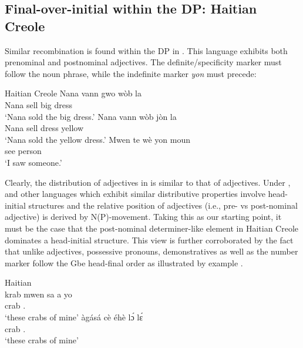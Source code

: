 \documentclass[output=paper]{langsci/langscibook}
\begin{document}
\subsection{Final-over-initial within the DP: Haitian Creole}

Similar recombination is found within the DP in 
\parencite{AbohDeGraff2014,Aboh2015}. This language exhibits both prenominal
and postnominal adjectives. The definite/specificity marker must follow the
noun phrase, while the indefinite marker \emph{yon} must precede:

\ea\label{ex:aboh:14.12} Haitian Creole \parencite[117--118]{DeGraff2007}
    \ea
        \gll    Nana vann gwo wòb la \\
                Nana sell big dress \Det{} \\
        \glt    \enquote*{Nana sold the big dress.}
    \ex
        \gll    Nana vann wòb jòn la \\
                Nana sell dress yellow \Det{} \\
        \glt    \enquote*{Nana sold the yellow dress.}
    \ex\label{ex:aboh:14.12c}
        \gll    Mwen te wè yon moun \\
                \Fsg{} \Ant{} see \Det{} person \\
        \glt    \enquote*{I saw someone.}
    \z
\z

Clearly, the distribution of adjectives in  is similar to\largerpage
that of  adjectives. Under \citet{Cinque2010},  and other 
languages which exhibit similar distributive properties involve head-initial
structures and the relative position of adjectives (i.e., pre- vs post-nominal
adjective) is derived by N(P)-movement. Taking this as our starting point, it
must be the case that the post-nominal determiner-like element in Haitian
Creole dominates a head-initial structure. This view is further corroborated by
the fact that unlike adjectives, possessive pronouns, demonstratives as well as
the number marker follow the Gbe head-final order as illustrated by example
.

\ea\label{ex:aboh:14.13}
    \ea Haitian \parencite[78]{Lefebvre1998}\\
    \sn
        \gll    krab mwen sa a yo\\
                crab \First{}.\Poss{} \Dem{} \Det{} \Pl{} \\
        \glt    \enquote*{these crabs of mine}
    \ex {} \parencite{Aboh2004a,Aboh2004b}
    \sn
        \gll    àgásá cè éhè l\'ɔ l\'ɛ \\
                crab \First{}.\Poss{} \Dem{} \Det{} \Pl{} \\
        \glt    \enquote*{these crabs of mine}
    \z
\z
\end{document}
